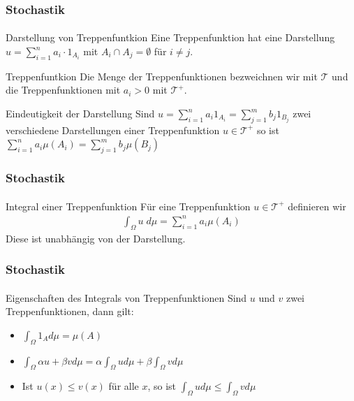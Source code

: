 \documentclass{beamer}
\begin{document}
\begin{frame}
    \frametitle{Stochastik}
\framesubtitle{}
    \begin{block}{Darstellung von Treppenfuntkion}
        Eine Treppenfunktion hat eine Darstellung $u = \sum_{i= 1}^n a_i \cdot  1_{A_i}$ mit $A_i \cap A_j = \emptyset$ für $i \neq j$.
    \end{block}

    \begin{block}{Treppenfuntkion}
        Die Menge der Treppenfunktionen bezweichnen wir mit $\mathcal{T}$ und die Treppenfunktionen mit $a_i > 0$ mit $\mathcal{T}^+$.        
    \end{block}
    
    \begin{block}{Eindeutigkeit der Darstellung}
        Sind $u = \sum_{i= 1}^n a_i 1_{A_i} = \sum_{j= 1}^m b_j 1_{B_j}$ zwei verschiedene Darstellungen einer Treppenfunktion 
        $u \in \mathcal{T}^+$
        so ist $\sum_{i= 1}^n a_i \mu (A_i) = \sum_{j= 1}^m b_j \mu (B_j)$
    \end{block}




\end{frame}


\begin{frame}
    \frametitle{Stochastik}
\framesubtitle{}
    \begin{block}{Integral einer Treppenfunktion}
        Für eine Treppenfunktion $u \in \mathcal{T}^+$ definieren wir
\begin{align*}
    \int_\Omega u \; d\mu= \sum_{i=1}^n a_i \mu(A_i)
\end{align*}
Diese ist unabhängig von der Darstellung.
    \end{block}

\end{frame}


\begin{frame}
    \frametitle{Stochastik}
\framesubtitle{}
\begin{block}{Eigenschaften des Integrals von Treppenfunktionen}
    Sind $u$ und $v$ zwei Treppenfunktionen, dann gilt:
    \begin{itemize}
    \item $\int_{\Omega} 1_A  d\mu  = \mu (A)$  
    \item $\int_{\Omega} \alpha u  + \beta v d\mu = \alpha \int_{\Omega}  u d\mu + \beta  \int_{\Omega}  v d\mu$
    \item Ist $u(x) \leq v(x)$ für alle $x$, so ist $\int_{\Omega} u d\mu \leq \int_{\Omega} v d\mu$ 
    \end{itemize}
    \end{block}
\end{frame}
\end{document}
